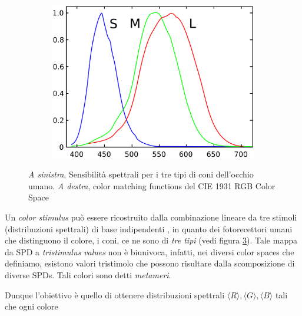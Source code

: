 \begin{figure}
	\centering
	\begin{subfigure}[t]{0.4\textwidth}
		\includegraphics[width=\textwidth]{../assets/chapter2_colorimetry_cones.png}
		\label{chapter2:CMFs:coneSpectralSensitivity}
	\end{subfigure}
	\begin{subfigure}[t]{0.55\textwidth}
		
		\label{chapter2:CMFs:RGBColorMatchingFunctions}
	\end{subfigure}
	\caption{\textit{A sinistra}, Sensibilit\`a spettrali per i tre tipi di coni dell'occhio umano. \textit{A destra}, color matching functions del 
			CIE 1931 RGB Color Space}
	\label{chapter2:CMFs}
\end{figure}
Un \textit{color stimulus} pu\`o essere ricostruito dalla combinazione lineare da tre stimoli (distribuzioni spettrali) di base indipendenti 
\cite{color}, in quanto dei fotorecettori umani che distinguono il colore, i coni, ce ne sono di \textit{tre tipi} (vedi figura 
\ref{chapter2:CMFs}). Tale mappa da SPD a \textit{tristimulus values} non \`e biunivoca, 
infatti, nei diversi color 
spaces che definiamo, esistono valori tristimolo che possono risultare dalla scomposizione di diverse SPDs. Tali colori 
sono detti \textit{metameri}.\par 
Dunque l'obiettivo \`e quello di ottenere distribuzioni spettrali $\langle R\rangle, \langle G\rangle, \langle B\rangle$ tali che ogni colore 
